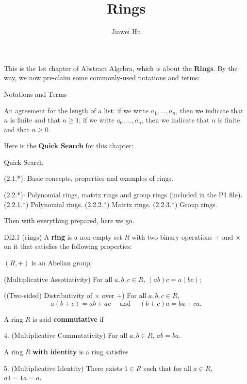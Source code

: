 \documentclass{article}
\title{\LARGE \textbf{Rings}}
\author{\large Jiawei Hu}
\begin{document}
\maketitle

This is the 1st chapter of Abstract Algebra, which is about the \textbf{Rings}. By the way, we now pre-claim some commonly-used notations and terms:
\begin{Df}{Notations and Terms}
    \begin{compactenum}
        \item An agreement for the length of a list: if we write $a_1, \dots, a_n$, then we indicate that $n$ is finite and that $n\geq 1$; if we write $a_0, \dots, a_n$, then we indicate that $n$ is finite and that $n\geq 0$.
    \end{compactenum}
\end{Df}

Here is the \textbf{Quick Search} for this chapter:
\begin{Th}{Quick Search}
    \begin{compactdesc}
        \item (2.1.*): Basic concepts, properties and examples of rings.
        \item (2.2.*): Polynomial rings, matrix rings and group rings (included in the P1 file).
            \subitem (2.2.1.*) Polynomial rings.
            \subitem (2.2.2.*) Matrix rings.
            \subitem (2.2.3.*) Group rings.
    \end{compactdesc}
\end{Th}

Then with everything prepared, here we go. 

\begin{Df}{Df2.1 (rings)}
    A \textbf{ring} is a non-empty set $R$ with two binary operations $+$ and $\times$ on it that satisfies the following properties:
    \begin{compactenum}
        \item $(R, +)$ is an Abelian group;
        \item (Multiplicative Assotiativity) For all $a, b, c \in R$, $(ab)c = a(bc)$;
        \item ((Two-sided) Distributivity of $\times$ over $+$) For all $a, b, c \in R$, 
        $$ a(b+c) = ab + ac \quad\text{ and }\quad (b+c)a = ba + ca. $$
    \end{compactenum}
    A ring $R$ is said \textbf{commutative} if
    \begin{compactenum}
        \item[4.] (Multiplicative Commutativity) For all $a, b \in R$, $ab = ba$.
    \end{compactenum}
    A ring $R$ \textbf{with identity} is a ring satisfies
    \begin{compactenum}
        \item[5.] (Multiplicative Identity) There exists $1 \in R$ such that for all $a \in R$, $a1 = 1a = a$.
    \end{compactenum}
\end{Df}
\end{document}

